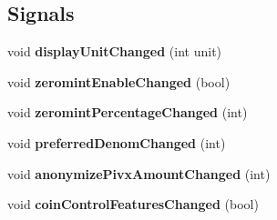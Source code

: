 \subsection*{Signals}
\begin{DoxyCompactItemize}
\item 
\mbox{\label{class_options_model_a7827a9cf0ceea0a429522974b620f11e}} 
void {\bfseries display\+Unit\+Changed} (int unit)
\item 
\mbox{\label{class_options_model_a46029511a8b1b75f808032fb75087d12}} 
void {\bfseries zeromint\+Enable\+Changed} (bool)
\item 
\mbox{\label{class_options_model_a19d8be171794c6d0628f627567250d2c}} 
void {\bfseries zeromint\+Percentage\+Changed} (int)
\item 
\mbox{\label{class_options_model_aecaf3c519b7860fe4a69c55575156f1a}} 
void {\bfseries preferred\+Denom\+Changed} (int)
\item 
\mbox{\label{class_options_model_a94b179a8c90de56c4f36f9d36a983615}} 
void {\bfseries anonymize\+Pivx\+Amount\+Changed} (int)
\item 
\mbox{\label{class_options_model_a469ef5e28f59f5b633a2f17943527389}} 
void {\bfseries coin\+Control\+Features\+Changed} (bool)
\end{DoxyCompactItemize}
